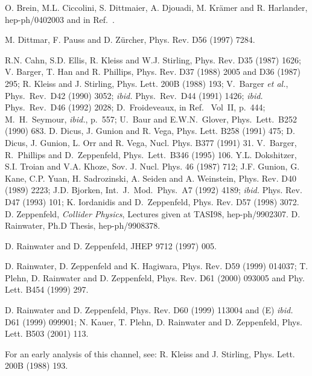 \begin{thebibliography}{999}
 O. Brein, M.L. Ciccolini, S. Dittmaier, A. Djouadi, 
M. Kr\"amer and R. Harlander, hep-ph/0402003 and in Ref.~\cite{Houches2003}.  

 M. Dittmar, F. Pauss and D. Z\"urcher, Phys. Rev. D56 
(1997) 7284. 

 R.N. Cahn, S.D. Ellis, R. Kleiss and W.J. Stirling, Phys. Rev. D35 (1987) 1626; V. Barger, T. Han and R. Phillips, Phys. Rev. D37 (1988) 
2005 and D36 (1987) 295; R. Kleiss and J. Stirling, Phys. Lett. 200B (1988) 193;
V.\, Barger {\it et al.}, Phys.\ Rev.\ D42 (1990) 3052; {\it ibid.}  Phys.\, 
Rev.\, D44 (1991)  1426; {\it ibid.}  Phys.\ Rev.\ D46 (1992) 2028; 
D.~Froideveaux, in Ref.~\cite{HiggsLHC} Vol~II, p.~444;
M.~H.~Seymour, {\it ibid.}, p.~557;
U.~Baur and E.W.N.~Glover, Phys.\ Lett.\ B252 (1990) 683.  
%
 D. Dicus, J. Gunion and R. Vega, Phys. Lett. B258 
(1991) 475; D. Dicus, J. Gunion, L. Orr and R. Vega, Nucl. Phys. B377 (1991) 
31. 
%
V.\, Barger, R.\, Phillips and D.\, Zeppenfeld, Phys.\, Lett.\, B346 (1995) 106. 
%
Y.L. Dokshitzer, S.I. Troian and V.A. Khoze, Sov. J. Nucl. Phys. 46 (1987) 712;
J.F. Gunion, G. Kane, C.P. Yuan, H. Sadrozinski, A. Seiden and A. Weinstein,
Phys. Rev. D40 (1989) 2223; J.D. Bjorken, Int.\ J.\ Mod.\ Phys.\ A7 (1992) 
4189; {\it ibid.} Phys. Rev. D47 (1993) 101; K. Iordanidis and D.\, Zeppenfeld, 
Phys. Rev. D57 (1998) 3072. 
%
 D. Zeppenfeld, {\it Collider Physics}, Lectures given at
TASI98, hep-ph/9902307. 
%
 D. Rainwater, Ph.D Thesis, hep-ph/9908378. 

 D. Rainwater and D. Zeppenfeld, JHEP 9712 (1997) 005. 

 D. Rainwater, D. Zeppenfeld and K. Hagiwara, Phys. Rev. D59
(1999) 014037; T. Plehn, D. Rainwater and D. Zeppenfeld, Phys. Rev. D61 (2000) 
093005 and Phy. Lett. B454 (1999) 297.  

 D. Rainwater and D. Zeppenfeld, Phys. Rev. D60 (1999) 113004
and (E) {\it ibid.} D61 (1999) 099901; N. Kauer, T. Plehn, D. Rainwater and D. 
Zeppenfeld, Phys. Lett. B503 (2001) 113. 

 For an early analysis of this channel, see: R. Kleiss
and J. Stirling, Phys. Lett. 200B (1988) 193.


\end{thebibliography}
